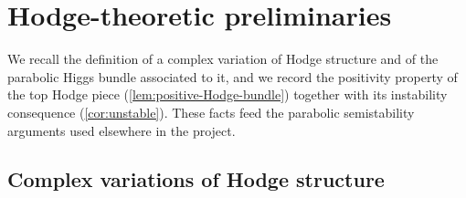 \chapter{Hodge-theoretic preliminaries}
\label{chap:hodge}


\providecommand{\id}{\operatorname{id}}

We recall the definition of a complex variation of Hodge structure and of the
parabolic Higgs bundle associated to it, and we record the positivity property of
the top Hodge piece (\cref{lem:positive-Hodge-bundle}) together with its
instability consequence (\cref{cor:unstable}). These facts feed the parabolic
semistability arguments used elsewhere in the project.

\section{Complex variations of Hodge structure}

